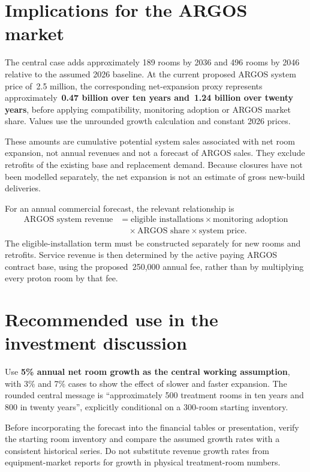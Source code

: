 \documentclass[11pt,a4paper]{article}
\begin{document}
\section{Implications for the ARGOS market}

The central case adds approximately 189 rooms by 2036 and 496 rooms by 2046
relative to the assumed 2026 baseline. At the current proposed ARGOS system
price of \EUR\,2.5 million, the corresponding net-expansion proxy represents
approximately \textbf{\EUR\,0.47 billion over ten years and \EUR\,1.24 billion
over twenty years}, before applying compatibility, monitoring adoption or
ARGOS market share. Values use the unrounded growth calculation and constant
2026 prices.

These amounts are cumulative potential system sales associated with net room
expansion, not annual revenues and not a forecast of ARGOS sales. They exclude
retrofits of the existing base and replacement demand. Because closures have
not been modelled separately, the net expansion is not an estimate of gross
new-build deliveries.

For an annual commercial forecast, the relevant relationship is
\begin{equation}
\begin{aligned}
\text{ARGOS system revenue}
&=\text{eligible installations}\times\text{monitoring adoption}\\
&\quad\times\text{ARGOS share}\times\text{system price}.
\end{aligned}
\end{equation}
The eligible-installation term must be constructed separately for new rooms
and retrofits. Service revenue is then determined by the active paying ARGOS
contract base, using the proposed \EUR\,250,000 annual fee, rather than by
multiplying every proton room by that fee.

\section{Recommended use in the investment discussion}

Use \textbf{5\% annual net room growth as the central working assumption}, with
3\% and 7\% cases to show the effect of slower and faster expansion. The rounded
central message is ``approximately 500 treatment rooms in ten years and 800 in
twenty years'', explicitly conditional on a 300-room starting inventory.

Before incorporating the forecast into the financial tables or presentation,
verify the starting room inventory and compare the assumed growth rates with a
consistent historical series. Do not substitute revenue growth rates from
equipment-market reports for growth in physical treatment-room numbers.
\end{document}
